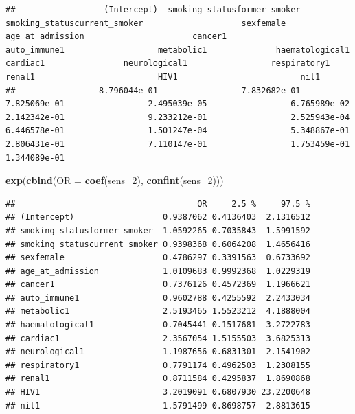 \documentclass[
]{article}
\newenvironment{Shaded}{\begin{snugshade}}{\end{snugshade}}
\newcommand{\DataTypeTok}[1]{\textcolor[rgb]{0.13,0.29,0.53}{#1}}
\newcommand{\DecValTok}[1]{\textcolor[rgb]{0.00,0.00,0.81}{#1}}
\newcommand{\KeywordTok}[1]{\textcolor[rgb]{0.13,0.29,0.53}{\textbf{#1}}}
\newcommand{\NormalTok}[1]{#1}
\newcommand{\OperatorTok}[1]{\textcolor[rgb]{0.81,0.36,0.00}{\textbf{#1}}}
\begin{document}
\begin{Shaded}
\end{Shaded}

\begin{verbatim}
##                  (Intercept)  smoking_statusformer_smoker smoking_statuscurrent_smoker                    sexfemale             age_at_admission                      cancer1                 auto_immune1                   metabolic1              haematological1                     cardiac1                neurological1                 respiratory1                       renal1                         HIV1                         nil1 
##                 8.796044e-01                 7.832682e-01                 7.825069e-01                 2.495039e-05                 6.765989e-02                 2.142342e-01                 9.233212e-01                 2.525943e-04                 6.446578e-01                 1.501247e-04                 5.348867e-01                 2.806431e-01                 7.110147e-01                 1.753459e-01                 1.344089e-01
\end{verbatim}

\begin{Shaded}
\begin{Highlighting}[]
\KeywordTok{exp}\NormalTok{(}\KeywordTok{cbind}\NormalTok{(}\DataTypeTok{OR =} \KeywordTok{coef}\NormalTok{(sens_}\DecValTok{2}\NormalTok{), }\KeywordTok{confint}\NormalTok{(sens_}\DecValTok{2}\NormalTok{)))}
\end{Highlighting}
\end{Shaded}

\begin{verbatim}
##                                     OR     2.5 %     97.5 %
## (Intercept)                  0.9387062 0.4136403  2.1316512
## smoking_statusformer_smoker  1.0592265 0.7035843  1.5991592
## smoking_statuscurrent_smoker 0.9398368 0.6064208  1.4656416
## sexfemale                    0.4786297 0.3391563  0.6733692
## age_at_admission             1.0109683 0.9992368  1.0229319
## cancer1                      0.7376126 0.4572369  1.1966621
## auto_immune1                 0.9602788 0.4255592  2.2433034
## metabolic1                   2.5193465 1.5523212  4.1888004
## haematological1              0.7045441 0.1517681  3.2722783
## cardiac1                     2.3567054 1.5155503  3.6825313
## neurological1                1.1987656 0.6831301  2.1541902
## respiratory1                 0.7791174 0.4962503  1.2308155
## renal1                       0.8711584 0.4295837  1.8690868
## HIV1                         3.2019091 0.6807930 23.2200648
## nil1                         1.5791499 0.8698757  2.8813615
\end{verbatim}
\end{document}
